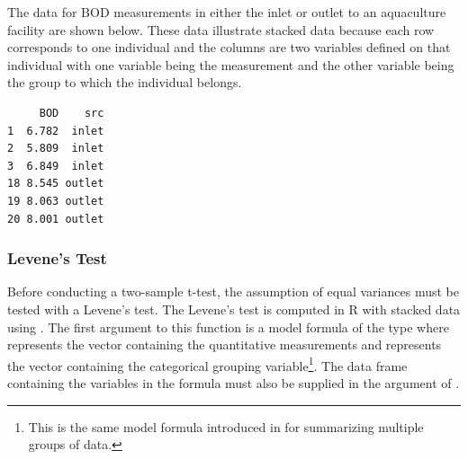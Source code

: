 \documentclass[10pt,openany]{book}\usepackage[]{graphicx}\usepackage[]{color}
\makeatletter
\newenvironment{kframe}{%
 \def\at@end@of@kframe{}%
 \ifinner\ifhmode%
  \def\at@end@of@kframe{\end{minipage}}%
  \begin{minipage}{\columnwidth}%
 \fi\fi%
 \def\FrameCommand##1{\hskip\@totalleftmargin \hskip-\fboxsep
 \colorbox{shadecolor}{##1}\hskip-\fboxsep
     \hskip-\linewidth \hskip-\@totalleftmargin \hskip\columnwidth}%
 \MakeFramed {\advance\hsize-\width
   \@totalleftmargin\z@ \linewidth\hsize
   \@setminipage}}%
 {\par\unskip\endMakeFramed%
 \at@end@of@kframe}
\newenvironment{knitrout}{}{} %
\makeatother
\begin{document}
The data for BOD measurements in either the inlet or outlet to an aquaculture facility are shown below.  These data illustrate stacked data because each row corresponds to one individual and the columns are two variables defined on that individual with one variable being the measurement and the other variable being the group to which the individual belongs.
\begin{knitrout}
\color{fgcolor}\begin{kframe}
\begin{verbatim}
     BOD    src
1  6.782  inlet
2  5.809  inlet
3  6.849  inlet
18 8.545 outlet
19 8.063 outlet
20 8.001 outlet
\end{verbatim}
\end{kframe}
\end{knitrout}


\vspace{-12pt}

\subsubsection{Levene's Test}
Before conducting a two-sample t-test, the assumption of equal variances must be tested with a Levene's test.  The Levene's test is computed in R with stacked data using .  The first argument to this function is a model formula of the type  where  represents the vector containing the quantitative measurements and  represents the vector containing the categorical grouping variable\footnote{This is the same model formula introduced in  for summarizing multiple groups of data.}.  The data frame containing the variables in the formula must also be supplied in the  argument of .
\end{document}
